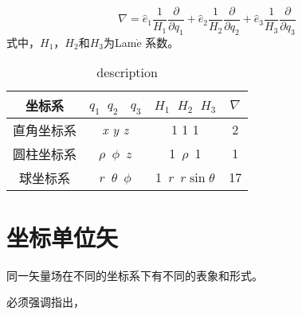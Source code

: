 \[
\nabla =\hat{e}_1\frac{1}{H_1}\frac{\partial}{\partial q_1}+\hat{e}_2\frac{1}{H_2}\frac{\partial}{\partial q_2}+\hat{e}_3\frac{1}{H_3}\frac{\partial}{\partial q_3}
\]
式中，$ H_1 $，$ H_2 $和$ H_3 $为Lam$\grave{\text{e}}$ 系数。

%	
%			
%		


\begin{table}
	\centering
	\caption{description}
	\begin{spacing}{2.5}		
	\begin{tabular}{cccc}
		\toprule  %
		
		
		坐标系& $ q_1$\ $ q_2$ \  $ q_3 $& $ H_1$\ $ H_2$\ $ H_3$& $ \nabla $\\
		\midrule  
		直角坐标系& \textit{x y z}& 1 1 1 &2\\
		圆柱坐标系& $\rho$\ $ \phi$\ $ z$& 1\ $ \rho $\ 1&1\\
		球坐标系  & $r$\ $\theta$\ $\phi$&1\ $r$\  $r\sin\theta$&17\\
		
		
		
		\bottomrule %
	\end{tabular}
	\end{spacing}
\end{table}

\section{坐标单位矢}
同一矢量场在不同的坐标系下有不同的表象和形式。

\begin{newdef}[]
必须强调指出，

\end{newdef}






